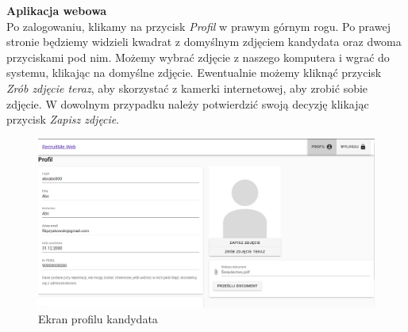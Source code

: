 \documentclass{article}
\begin{document}
\textbf{Aplikacja webowa} \\
Po zalogowaniu, klikamy na przycisk \emph{Profil} w prawym górnym rogu. Po prawej stronie będziemy widzieli kwadrat z domyślnym zdjęciem kandydata oraz dwoma przyciskami pod nim. Możemy wybrać zdjęcie z naszego komputera i wgrać do systemu, klikając na domyślne zdjęcie. Ewentualnie możemy kliknąć przycisk \emph{Zrób zdjęcie teraz}, aby skorzystać z kamerki internetowej, aby zrobić sobie zdjęcie. W dowolnym przypadku należy potwierdzić swoją decyzję klikając przycisk \emph{Zapisz zdjęcie}.
\begin{figure}[H]
    \centering
    \includegraphics[width=1\linewidth]{images/web/profil.png}
    \caption{Ekran profilu kandydata}
    \label{fig:test3_label}
\end{figure}
\end{document}
